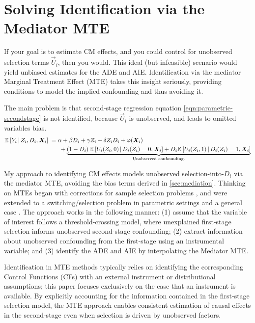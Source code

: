 \section{Solving Identification via the Mediator MTE}
\label{sec:selectionmodel}
If your goal is to estimate CM effects, and you could control for unobserved selection terms $\vec U_i$, then you would.
This ideal (but infeasible) scenario would yield unbiased estimates for the ADE and AIE.
Identification via the mediator Marginal Treatment Effect (MTE) takes this insight seriously, providing conditions to model the implied confounding and thus avoiding it.

The main problem is that second-stage regression equation \eqref{eqn:parametric-secondstage} is not identified, because $\vec U_i$ is unobserved, and leads to omitted variables bias.
\begin{align}
    \mathbb{E}_{} \left[ Y_i \, \middle\vert \, Z_i, D_i, \boldsymbol{\mathit{X}}_i \right] \; =& \;
        \alpha
        + \beta D_i
        + \gamma Z_i
        + \delta Z_i D_i
        + \varphi(\boldsymbol{\mathit{X}}_i)
        \label{eqn:secondstage-reg} \\
        & \;\; +\underbrace{\left( 1 - D_i
            \right) \mathbb{E}_{} \left[  U_i(Z_i, 0)  \, \middle\vert \, D_i(Z_i) = 0, \boldsymbol{\mathit{X}}_i \right]
                + D_i \mathbb{E}_{} \left[  U_i(Z_i, 1)  \, \middle\vert \, D_i(Z_i) = 1, \boldsymbol{\mathit{X}}_i \right]}_{
                    \text{Unobserved confounding.}}
        \nonumber
\end{align}

My approach to identifying CM effects models unobserved selection-into-$D_i$ via the mediator MTE, avoiding the bias terms derived in \autoref{sec:mediation}.
Thinking on MTEs began with corrections for sample selection problems \citep{heckman1974shadow}, and were extended to a switching/selection problem in parametric settings \citep{heckman1979sample,bjorklund1987estimation} and a general case \citep{heckman2005structural}.
The approach works in the following manner: (1) assume that the variable of interest follows a threshold-crossing model, where unexplained first-stage selection informs unobserved second-stage confounding; (2) extract information about unobserved confounding from the first-stage using an instrumental variable; and (3) identify the ADE and AIE by interpolating the Mediator MTE.

Identification in MTE methods typically relies on identifying the corresponding Control Functions (CFs) with an external instrument or distributional assumptions; this paper focuses exclusively on the case that an instrument is available.
By explicitly accounting for the information contained in the first-stage selection model, the MTE approach enables consistent estimation of causal effects in the second-stage even when selection is driven by unobserved factors.

